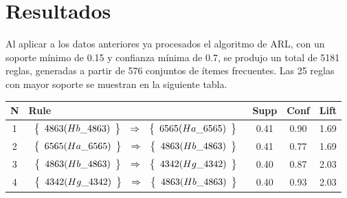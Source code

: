 \section{Resultados}

Al aplicar a los datos anteriores ya procesados el algoritmo de ARL, con un soporte mínimo de 0.15 y confianza mínima de 0.7, se produjo un total de 5181 reglas, generadas a partir de 576 conjuntos de ítemes frecuentes. Las 25 reglas con mayor soporte se muestran en la siguiente tabla.

\begin{longtable}{| c | l | c | c | c |}
\hline
\textbf{N} & \textbf{Rule} & \textbf{Supp} & \textbf{Conf} & \textbf{Lift} \\ \hline
1 & $\begin{array}{c c c}\left\{\begin{array}{c}4863 (Hb\_4863)\end{array}\right\} & \Rightarrow & \left\{\begin{array}{c}6565 (Ha\_6565)\end{array}\right\}\end{array}$ & 0.41 & 0.90 & 1.69 \\ \hline
2 & $\begin{array}{c c c}\left\{\begin{array}{c}6565 (Ha\_6565)\end{array}\right\} & \Rightarrow & \left\{\begin{array}{c}4863 (Hb\_4863)\end{array}\right\}\end{array}$ & 0.41 & 0.77 & 1.69 \\ \hline
3 & $\begin{array}{c c c}\left\{\begin{array}{c}4863 (Hb\_4863)\end{array}\right\} & \Rightarrow & \left\{\begin{array}{c}4342 (Hg\_4342)\end{array}\right\}\end{array}$ & 0.40 & 0.87 & 2.03 \\ \hline
4 & $\begin{array}{c c c}\left\{\begin{array}{c}4342 (Hg\_4342)\end{array}\right\} & \Rightarrow & \left\{\begin{array}{c}4863 (Hb\_4863)\end{array}\right\}\end{array}$ & 0.40 & 0.93 & 2.03 \\ \hline

\end{longtable}
